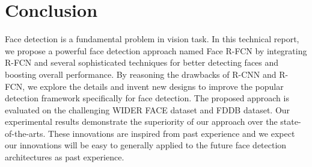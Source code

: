 \documentclass{article} %
\begin{document}
\section{Conclusion}

Face detection is a fundamental problem in vision task.  
In this technical report, we propose a powerful face detection approach named Face R-FCN by integrating R-FCN and several sophisticated techniques for better detecting faces and boosting overall performance. By reasoning the drawbacks of R-CNN and R-FCN, we explore the details and invent new designs to improve the popular detection framework specifically for face detection. The proposed approach is evaluated on the challenging WIDER FACE dataset and FDDB dataset. Our experimental results demonstrate the superiority of our approach over the state-of-the-arts. These innovations are inspired from past experience and we expect our innovations will be easy to generally applied to the future face detection architectures as past experience. 




{\small
%


}
\end{document}

